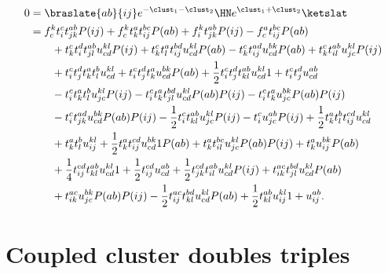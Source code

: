         \begin{align}
            0 & = \braslate{ab}{ij} e^{-\clust_1 - \clust_2} \HN
            e^{\clust_1 + \clust_2}\ketslat
            \\
            &=
            f^{k}_{c} t^{c}_{i} t^{ab}_{jk} P(ij)
            + f^{k}_{c} t^{a}_{k} t^{bc}_{ij} P(ab)
            + f^{k}_{i} t^{ab}_{jk} P(ij)
            - f^{a}_{c} t^{bc}_{ij} P(ab)
            \nonumber \\
            &\qquad
            + t^{c}_{k} t^{d}_{i} t^{ab}_{jl} u^{kl}_{cd} P(ij)
            + t^{c}_{k} t^{a}_{l} t^{bd}_{ij} u^{kl}_{cd} P(ab)
            - t^{c}_{k} t^{ad}_{ij} u^{bk}_{cd} P(ab)
            + t^{c}_{k} t^{ab}_{il} u^{kl}_{jc} P(ij)
            \nonumber \\
            &\qquad
            + t^{c}_{i} t^{d}_{j} t^{a}_{k} t^{b}_{l} u^{kl}_{cd}
            + t^{c}_{i} t^{d}_{j} t^{a}_{k} u^{bk}_{cd} P(ab)
            + \frac{1}{2} t^{c}_{i} t^{d}_{j} t^{ab}_{kl} u^{kl}_{cd} 1
            + t^{c}_{i} t^{d}_{j} u^{ab}_{cd}
            \nonumber \\
            &\qquad
            - t^{c}_{i} t^{a}_{k} t^{b}_{l} u^{kl}_{jc} P(ij)
            - t^{c}_{i} t^{a}_{k} t^{bd}_{jl} u^{kl}_{cd} P(ab) P(ij)
            - t^{c}_{i} t^{a}_{k} u^{bk}_{jc} P(ab) P(ij)
            \nonumber \\
            &\qquad
            - t^{c}_{i} t^{ad}_{jk} u^{bk}_{cd} P(ab) P(ij)
            - \frac{1}{2} t^{c}_{i} t^{ab}_{kl} u^{kl}_{jc} P(ij)
            - t^{c}_{i} u^{ab}_{jc} P(ij)
            + \frac{1}{2} t^{a}_{k} t^{b}_{l} t^{cd}_{ij} u^{kl}_{cd}
            \nonumber \\
            &\qquad
            + t^{a}_{k} t^{b}_{l} u^{kl}_{ij}
            + \frac{1}{2} t^{a}_{k} t^{cd}_{ij} u^{bk}_{cd} 1 P(ab)
            + t^{a}_{k} t^{bc}_{il} u^{kl}_{jc} P(ab) P(ij)
            + t^{a}_{k} u^{bk}_{ij} P(ab)
            \nonumber \\
            &\qquad
            + \frac{1}{4} t^{cd}_{ij} t^{ab}_{kl} u^{kl}_{cd} 1
            + \frac{1}{2} t^{cd}_{ij} u^{ab}_{cd}
            + \frac{1}{2} t^{cd}_{jk} t^{ab}_{il} u^{kl}_{cd} P(ij)
            + t^{ac}_{ik} t^{bd}_{jl} u^{kl}_{cd} P(ab)
            \nonumber \\
            &\qquad
            + t^{ac}_{ik} u^{bk}_{jc} P(ab) P(ij)
            - \frac{1}{2} t^{ac}_{ij} t^{bd}_{kl} u^{kl}_{cd} P(ab)
            + \frac{1}{2} t^{ab}_{kl} u^{kl}_{ij} 1
            + u^{ab}_{ij}.
        \end{align}

    \section{Coupled cluster doubles triples}

